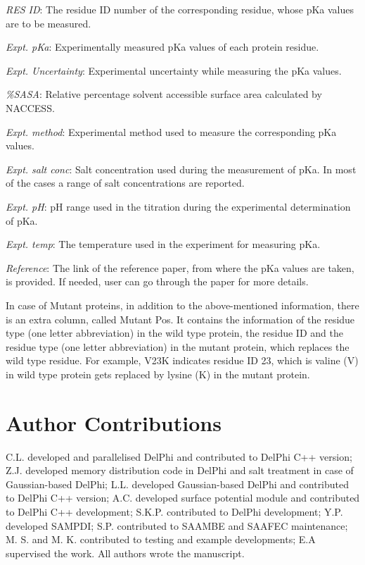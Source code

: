 \documentclass[9pt,tutorial,pubversion]{livecoms}
\begin{document}
\textit{RES ID}: The residue ID number of the corresponding residue, whose pKa values are to be measured.

\textit{Expt. pKa}: Experimentally measured pKa values of each protein residue.

\textit{Expt. Uncertainty}: Experimental uncertainty while measuring the pKa values.

\textit{\%SASA}: Relative percentage solvent accessible surface area calculated by NACCESS.

\textit{Expt. method}: Experimental method used to measure the corresponding pKa values.

\textit{Expt. salt conc}: Salt concentration used during the measurement of pKa. In most of the cases a range of salt concentrations are reported.

\textit{Expt. pH}: pH range used in the titration during the experimental determination of pKa.

\textit{Expt. temp}: The temperature used in the experiment for measuring pKa.

\textit{Reference}: The link of the reference paper, from where the pKa values are taken, is provided. If needed, user can go through the paper for more details.

In case of Mutant proteins, in addition to the above-mentioned information, there is an extra column, called Mutant Pos. It contains the information of the residue type (one letter abbreviation) in the wild type protein, the residue ID and the residue type (one letter abbreviation) in the mutant protein, which replaces the wild type residue. For example, V23K indicates residue ID 23, which is valine (V) in wild type protein gets replaced by lysine (K) in the mutant protein.


\section{Author Contributions}
%
C.L. developed and parallelised DelPhi and contributed to DelPhi C++ version; Z.J. developed memory distribution code in DelPhi and salt treatment in case of Gaussian-based DelPhi; L.L. developed Gaussian-based DelPhi and contributed to DelPhi C++ version; A.C. developed surface potential module and contributed to DelPhi C++ development;  S.K.P. contributed to DelPhi development; Y.P. developed SAMPDI; S.P.  contributed to SAAMBE and SAAFEC maintenance; M. S. and M. K. contributed to testing and example developments; E.A supervised the work. All authors wrote the manuscript. 
\end{document}
